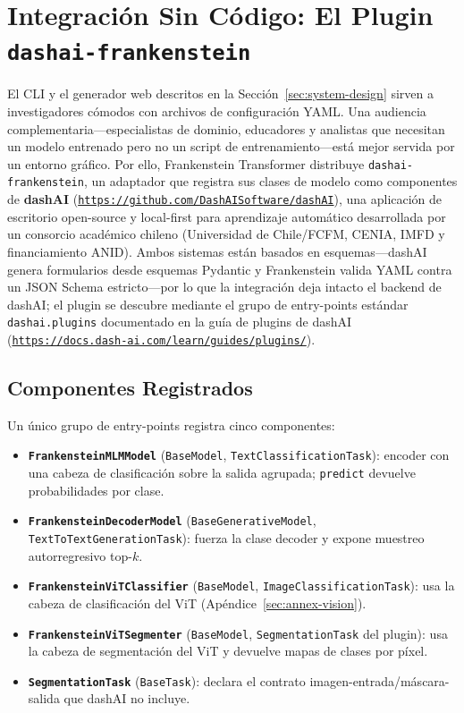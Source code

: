 \section{Integración Sin Código: El Plugin \texttt{dashai-frankenstein}}
\label{sec:dashai-plugin}

El CLI y el generador web descritos en la Sección~\ref{sec:system-design} sirven a investigadores cómodos con archivos de configuración YAML. Una audiencia complementaria---especialistas de dominio, educadores y analistas que necesitan un modelo entrenado pero no un script de entrenamiento---está mejor servida por un entorno gráfico. Por ello, Frankenstein Transformer distribuye \texttt{dashai-frankenstein}, un adaptador que registra sus clases de modelo como componentes de \textbf{dashAI} (\texttt{\url{https://github.com/DashAISoftware/dashAI}}), una aplicación de escritorio open-source y local-first para aprendizaje automático desarrollada por un consorcio académico chileno (Universidad de Chile/FCFM, CENIA, IMFD y financiamiento ANID). Ambos sistemas están basados en esquemas---dashAI genera formularios desde esquemas Pydantic y Frankenstein valida YAML contra un JSON Schema estricto---por lo que la integración deja intacto el backend de dashAI; el plugin se descubre mediante el grupo de entry-points estándar \texttt{dashai.plugins} documentado en la guía de plugins de dashAI (\texttt{\url{https://docs.dash-ai.com/learn/guides/plugins/}}).

\subsection{Componentes Registrados}

Un único grupo de entry-points registra cinco componentes:
\begin{itemize}[leftmargin=*]
    \item \textbf{\texttt{FrankensteinMLMModel}} (\texttt{BaseModel}, \texttt{TextClassificationTask}): encoder con una cabeza de clasificación sobre la salida agrupada; \texttt{predict} devuelve probabilidades por clase.
    \item \textbf{\texttt{FrankensteinDecoderModel}} (\texttt{BaseGenerativeModel}, \texttt{TextToTextGenerationTask}): fuerza la clase decoder y expone muestreo autorregresivo top-$k$.
    \item \textbf{\texttt{FrankensteinViTClassifier}} (\texttt{BaseModel}, \texttt{ImageClassificationTask}): usa la cabeza de clasificación del ViT (Apéndice~\ref{sec:annex-vision}).
    \item \textbf{\texttt{FrankensteinViTSegmenter}} (\texttt{BaseModel}, \texttt{SegmentationTask} del plugin): usa la cabeza de segmentación del ViT y devuelve mapas de clases por píxel.
    \item \textbf{\texttt{SegmentationTask}} (\texttt{BaseTask}): declara el contrato imagen-entrada/máscara-salida que dashAI no incluye.
\end{itemize}

